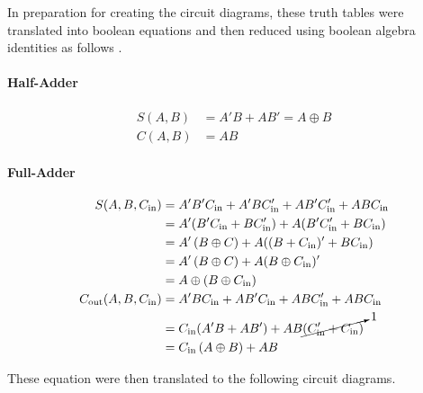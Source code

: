 \documentclass[11pt, letterpaper]{article} %
\begin{document}
In preparation for creating the circuit diagrams, these truth tables were translated into boolean equations and then reduced using boolean algebra identities as follows \cite{fell-discrete-structure}.

\paragraph{Half-Adder}
\begin{align*}
    S(A,B) &= A'B + AB' = A\oplus B \\
    C(A,B) &= A B
\end{align*}

\paragraph{Full-Adder}
\begin{align*}
    S(A,B,C_\mathrm{in}) &= A'B'C_\mathrm{in} + A'BC_\mathrm{in}' + AB'C_\mathrm{in}' + ABC_\mathrm{in}\\
        &= A'(B'C_\mathrm{in} + BC_\mathrm{in}') + A(B'C_\mathrm{in}' + BC_\mathrm{in})\\
        &= A'\left(B \oplus C\right) +A((B + C_\mathrm{in})' +BC_\mathrm{in})\\
         &= A'\left(B \oplus C\right) +A(B\oplus C_\mathrm{in})'\\
        &= A \oplus (B \oplus C_\mathrm{in})\\
    C_\mathrm{out}(A,B,C_\mathrm{in}) &= A'BC_\mathrm{in} + AB'C_\mathrm{in} + ABC_\mathrm{in}' + ABC_\mathrm{in}\\
        &= C_\mathrm{in} (A'B + AB') + AB\cancelto{1}{(C_\mathrm{in}' + C_\mathrm{in})}\\
        &= C_\mathrm{in}\left(A\oplus B\right) + AB
\end{align*}

These equation were then translated to the following circuit diagrams.
\end{document}
